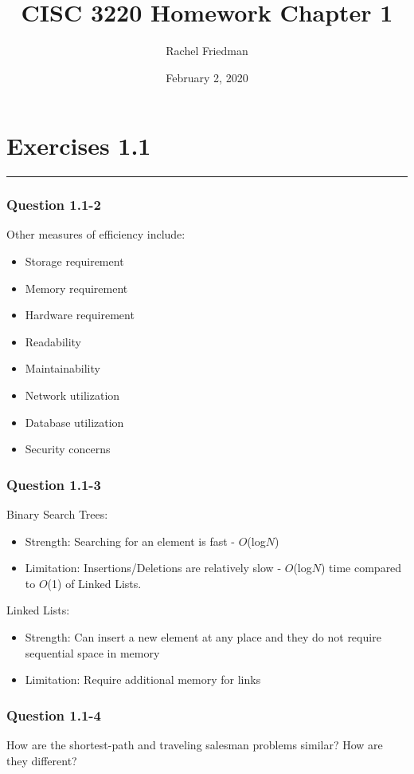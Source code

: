 \documentclass[10pt]{article}
\title{CISC 3220 Homework Chapter 1}
\author{Rachel Friedman}
\date{February 2, 2020}
\begin{document}
\maketitle

\section*{Exercises 1.1}\nointerlineskip
\noindent \rule{\linewidth}{0.01pt}
\subsubsection*{Question 1.1-2}
Other measures of efficiency include:
\begin{itemize}
    \item Storage requirement 
    \item Memory requirement 
    \item Hardware requirement 
    \item Readability 
    \item Maintainability
    \item Network utilization 
    \item Database utilization
    \item Security concerns
\end{itemize}

\subsubsection*{Question 1.1-3}

Binary Search Trees:
\begin{itemize}
\item Strength: Searching for an element is fast - $O$(log$N$)
\item Limitation: Insertions/Deletions are relatively slow - $O$(log$N$) time compared to $O$(1) of Linked Lists.
\end{itemize}
Linked Lists:
\begin{itemize}
\item Strength: Can insert a new element at any place and they do not require sequential space in memory
\item Limitation: Require additional memory for links
\end{itemize}

\subsubsection*{Question 1.1-4}
How are the shortest-path and traveling salesman problems similar? How are they different?\\
\end{document}
